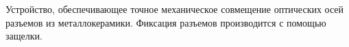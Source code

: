 Устройство, обеспечивающее точное механическое совмещение 
оптических осей разъемов из металлокерамики. Фиксация 
разъемов производится с помощью защелки.